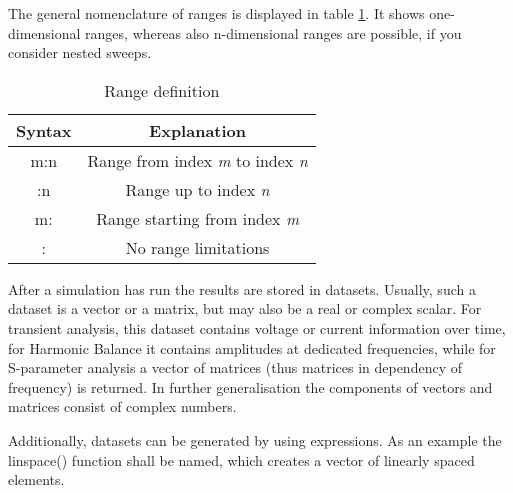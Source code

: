 
The general nomenclature of ranges is displayed in table \ref{table:Range-definition}.
It shows one-dimensional ranges, whereas also n-dimensional ranges
are possible, if you consider nested sweeps.

%
\begin{table}
\begin{center}\begin{tabular}{|c|c|}
\hline 
Syntax&
Explanation\tabularnewline
\hline
\hline 
m:n&
Range from index \textit{m} to index \textit{n}\tabularnewline
\hline 
:n&
Range up to index \textit{n}\tabularnewline
\hline 
m:&
Range starting from index \textit{m}\tabularnewline
\hline 
:&
No range limitations\tabularnewline
\hline
\end{tabular}\end{center}


\caption{\label{table:Range-definition}Range definition}
\end{table}




After a simulation has run the results are stored in datasets. Usually,
such a dataset is a vector or a matrix, but may also be a real or
complex scalar. For transient analysis, this dataset contains voltage
or current information over time, for Harmonic Balance it contains
amplitudes at dedicated frequencies, while for S-parameter analysis
a vector of matrices (thus matrices in dependency of frequency) is
returned. In further generalisation the components of vectors and
matrices consist of complex numbers.

Additionally, datasets can be generated by using expressions. As an
example the linspace() function shall be named, which creates a vector
of linearly spaced elements.
